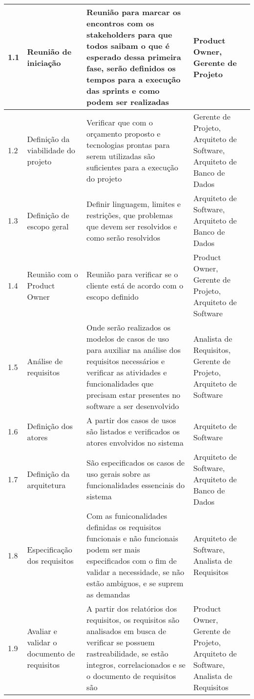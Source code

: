 \begin{longtable}[c]{|p{1.89em}|p{7.835em}|p{18.22em}|p{6.835em}|}
    1.1   & Reunião de iniciação & Reunião para marcar os encontros com os stakeholders para que todos saibam o que é esperado dessa primeira fase, serão definidos os tempos para a execução das sprints e como podem ser realizadas & Product Owner, Gerente de Projeto \\
    \midrule
    1.2   & Definição da viabilidade do projeto & Verificar que com o orçamento proposto e tecnologias prontas para serem utilizadas são suficientes para a execução do projeto & Gerente de Projeto, Arquiteto de Software, Arquiteto de Banco de Dados \\
    \midrule
    1.3   & Definição de escopo geral & Definir linguagem, limites e restrições, que problemas que devem ser resolvidos e como serão resolvidos & Arquiteto de Software, Arquiteto de Banco de Dados \\
    \midrule
    1.4   & Reunião com o Product Owner & Reunião para verificar se o cliente está de acordo com o escopo definido & Product Owner, Gerente de Projeto, Arquiteto de Software \\
    \midrule
    1.5   & Análise de requisitos & Onde serão realizados os modelos de casos de uso para auxiliar na análise dos requisitos necessários e verificar as atividades e funcionalidades que precisam estar presentes no software a ser desenvolvido & Analista de Requisitos, Gerente de Projeto, Arquiteto de Software \\
    \midrule
    1.6   & Definição dos atores & A partir dos casos de usos são listados e verificados os atores envolvidos no sistema & Arquiteto de Software \\
    \midrule
    1.7   & Definição da arquitetura & São especificados os casos de uso gerais sobre as funcionalidades essenciais do sistema & Arquiteto de Software, Arquiteto de Banco de Dados \\
    \midrule
    1.8   & Especificação dos requisitos & Com as funiconalidades definidas os requisitos funcionais e não funcionais podem ser mais especificados com o fim de validar a necessidade, se não estão ambiguos, e se suprem as demandas & Arquiteto de Software, Analista de Requisitos \\
    \midrule
    1.9   & Avaliar e validar o documento de requisitos & A partir dos relatórios dos requisitos, os requisitos são analisados em busca de verificar se possuem rastreabilidade, se estão integros, correlacionados e se o documento de requisitos são & Product Owner, Gerente de Projeto, Arquiteto de Software, Analista de Requisitos \\

\end{longtable}
